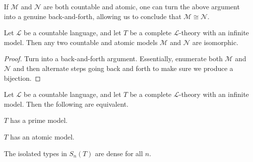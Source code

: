 \documentclass[../notes.tex]{subfiles}
\begin{document}
If $\mathcal M$ and $\mathcal N$ are both countable and atomic, one can turn the above argument into a genuine back-and-forth, allowing us to conclude that $\mathcal M\cong\mathcal N$.
\begin{proposition}
	Let $\mathcal L$ be a countable language, and let $T$ be a complete $\mathcal L$-theory with an infinite model. Then any two countable and atomic models $\mathcal M$ and $\mathcal N$ are isomorphic.
\end{proposition}
\begin{proof}
	Turn  into a back-and-forth argument. Essentially, enumerate both $\mathcal M$ and $\mathcal N$ and then alternate steps going back and forth to make sure we produce a bijection.
\end{proof}
\begin{theorem}
	Let $\mathcal L$ be a countable language, and let $T$ be a complete $\mathcal L$-theory with an infinite model. Then the following are equivalent.
	\begin{listalph}
		\item $T$ has a prime model.
		\item $T$ has an atomic model.
		\item The isolated types in $S_n(T)$ are dense for all $n$.
	\end{listalph}
\end{theorem}
\end{document}
